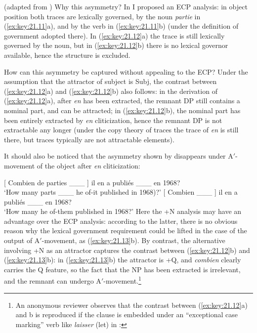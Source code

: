 \documentclass[output=paper]{langsci/langscibook}
\begin{document}
\begin{exe}
\ea%
    \label{ex:key:21.12} (adapted from \citealt{Ruwet1972})
    \z
\z
%
Why this asymmetry? In \citet[37--38]{Rizzi1990} I proposed an \gls{ECP}
analysis: in object position both traces are lexically governed, by the noun
\emph{partie} in (\ref{ex:key:21.11}a), and by the verb in (\ref{ex:key:21.11}b)
(under the definition of government adopted there). In (\ref{ex:key:21.12}a) the
trace is still lexically governed by the noun, but in (\ref{ex:key:21.12}b) there
is no lexical governor available, hence the structure is excluded.

How can this asymmetry be captured without appealing to the ECP? Under the
assumption that the attractor of subject is Subj\tss{[+N]}, the contrast
between (\ref{ex:key:21.12}a) and (\ref{ex:key:21.12}b) also follows: in the
derivation of (\ref{ex:key:21.12}a), after \emph{en} has been extracted, the
remnant DP still contains a nominal part, and can be attracted; in
(\ref{ex:key:21.12}b), the nominal part has been entirely extracted by
\emph{en} cliticization, hence the remnant DP is not extractable any longer
(under the copy theory of traces the trace of \emph{en} is still there, but
traces typically are not attractable elements).

It should also be noticed that the asymmetry shown by 
disappears under A$'$-movement of the object after \emph{en} cliticization:

\ea%
    \label{ex:key:21.13}
    \ea {}[ Combien de parties \_\_\_ ] il en a publiés \_\_\_ en 1968?\\
        ‘How many parts \_\_\_  he of-it published in 1968)?’
    \ex {}[ Combien \_\_\_ ]  il en a publiés \_\_\_ en 1968?\\
            ‘How many        he of-them published in 1968?’
    \z
\z\largerpage[-5]
%
Here the +N analysis may have an advantage over the \gls{ECP} analysis:
according to the latter, there is no obvious reason why the lexical government
requirement could be lifted in the case of the output of A$'$-movement, as
(\ref{ex:key:21.13}b). By contrast, the alternative involving +N as an attractor
captures the contrast between (\ref{ex:key:21.12}b) and (\ref{ex:key:21.13}b): in
(\ref{ex:key:21.13}b) the attractor is +Q, and \emph{combien} clearly carries the
Q feature, so the fact that the NP has been extracted is irrelevant, and the
remnant can undergo A$'$-movement.\footnote{An anonymous reviewer observes that
the contrast between (\ref{ex:key:21.12}a) and b is reproduced if the clause is
embedded under an “exceptional case marking” verb like \emph{laisser} (let) in
:

}
\end{exe}
\end{document}
